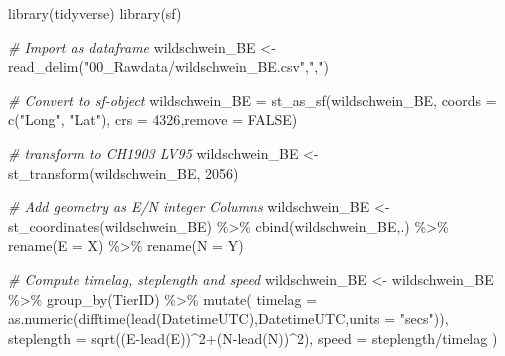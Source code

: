 \documentclass[
]{book}
\newenvironment{Shaded}{\begin{snugshade}}{\end{snugshade}}
\newcommand{\AttributeTok}[1]{\textcolor[rgb]{0.77,0.63,0.00}{#1}}
\newcommand{\CommentTok}[1]{\textcolor[rgb]{0.56,0.35,0.01}{\textit{#1}}}
\newcommand{\ConstantTok}[1]{\textcolor[rgb]{0.00,0.00,0.00}{#1}}
\newcommand{\DecValTok}[1]{\textcolor[rgb]{0.00,0.00,0.81}{#1}}
\newcommand{\FunctionTok}[1]{\textcolor[rgb]{0.00,0.00,0.00}{#1}}
\newcommand{\NormalTok}[1]{#1}
\newcommand{\OtherTok}[1]{\textcolor[rgb]{0.56,0.35,0.01}{#1}}
\newcommand{\SpecialCharTok}[1]{\textcolor[rgb]{0.00,0.00,0.00}{#1}}
\newcommand{\StringTok}[1]{\textcolor[rgb]{0.31,0.60,0.02}{#1}}
\begin{document}
\begin{Shaded}
\begin{Highlighting}[]
\FunctionTok{library}\NormalTok{(tidyverse)}
\FunctionTok{library}\NormalTok{(sf)}

\CommentTok{\# Import as dataframe}
\NormalTok{wildschwein\_BE }\OtherTok{\textless{}{-}} \FunctionTok{read\_delim}\NormalTok{(}\StringTok{"00\_Rawdata/wildschwein\_BE.csv"}\NormalTok{,}\StringTok{","}\NormalTok{)}

\CommentTok{\# Convert to sf{-}object}
\NormalTok{wildschwein\_BE }\OtherTok{=} \FunctionTok{st\_as\_sf}\NormalTok{(wildschwein\_BE, }\AttributeTok{coords =} \FunctionTok{c}\NormalTok{(}\StringTok{"Long"}\NormalTok{, }\StringTok{"Lat"}\NormalTok{), }\AttributeTok{crs =} \DecValTok{4326}\NormalTok{,}\AttributeTok{remove =} \ConstantTok{FALSE}\NormalTok{)}

\CommentTok{\# transform to CH1903 LV95}
\NormalTok{wildschwein\_BE }\OtherTok{\textless{}{-}} \FunctionTok{st\_transform}\NormalTok{(wildschwein\_BE, }\DecValTok{2056}\NormalTok{)}

\CommentTok{\# Add geometry as E/N integer Columns}
\NormalTok{wildschwein\_BE }\OtherTok{\textless{}{-}} \FunctionTok{st\_coordinates}\NormalTok{(wildschwein\_BE) }\SpecialCharTok{\%\textgreater{}\%}
  \FunctionTok{cbind}\NormalTok{(wildschwein\_BE,.) }\SpecialCharTok{\%\textgreater{}\%}
  \FunctionTok{rename}\NormalTok{(}\AttributeTok{E =}\NormalTok{ X) }\SpecialCharTok{\%\textgreater{}\%}
  \FunctionTok{rename}\NormalTok{(}\AttributeTok{N =}\NormalTok{ Y)}

\CommentTok{\# Compute timelag, steplength and speed}
\NormalTok{wildschwein\_BE }\OtherTok{\textless{}{-}}\NormalTok{ wildschwein\_BE }\SpecialCharTok{\%\textgreater{}\%}
  \FunctionTok{group\_by}\NormalTok{(TierID) }\SpecialCharTok{\%\textgreater{}\%}
  \FunctionTok{mutate}\NormalTok{(}
    \AttributeTok{timelag =} \FunctionTok{as.numeric}\NormalTok{(}\FunctionTok{difftime}\NormalTok{(}\FunctionTok{lead}\NormalTok{(DatetimeUTC),DatetimeUTC,}\AttributeTok{units =} \StringTok{"secs"}\NormalTok{)),}
    \AttributeTok{steplength =} \FunctionTok{sqrt}\NormalTok{((E}\SpecialCharTok{{-}}\FunctionTok{lead}\NormalTok{(E))}\SpecialCharTok{\^{}}\DecValTok{2}\SpecialCharTok{+}\NormalTok{(N}\SpecialCharTok{{-}}\FunctionTok{lead}\NormalTok{(N))}\SpecialCharTok{\^{}}\DecValTok{2}\NormalTok{),}
    \AttributeTok{speed =}\NormalTok{ steplength}\SpecialCharTok{/}\NormalTok{timelag}
\NormalTok{  )}
\end{Highlighting}
\end{Shaded}
\end{document}
